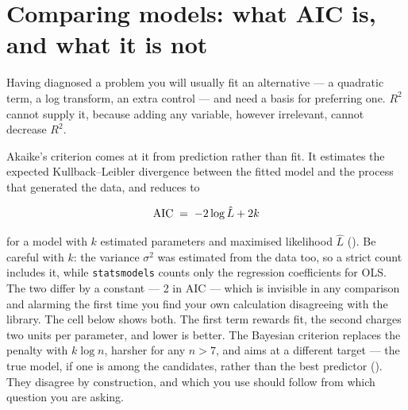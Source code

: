 \documentclass[
  letterpaper,
  10pt,
  twoside,
  openright,
  numbers=noenddot,
  chapterprefix=true]{scrbook}
\begin{document}
\section{Comparing models: what AIC is, and what it is
not}\label{comparing-models-what-aic-is-and-what-it-is-not}

Having diagnosed a problem you will usually fit an alternative --- a
quadratic term, a log transform, an extra control --- and need a basis
for preferring one. \(R^2\) cannot supply it, because adding any
variable, however irrelevant, cannot decrease \(R^2\).

Akaike's criterion comes at it from prediction rather than fit. It
estimates the expected Kullback--Leibler divergence between the fitted
model and the process that generated the data, and reduces to

\[
\mathrm{AIC} \thickspace=\thickspace -2 \log \hat{L} + 2k
\]

for a model with \(k\) estimated parameters and maximised likelihood
\(\hat L\) (). Be careful with
\(k\): the variance \(\sigma^2\) was estimated from the data too, so a
strict count includes it, while \texttt{statsmodels} counts only the
regression coefficients for OLS. The two differ by a constant --- 2 in
AIC --- which is invisible in any comparison and alarming the first time
you find your own calculation disagreeing with the library. The cell
below shows both. The first term rewards fit, the second charges two
units per parameter, and lower is better. The Bayesian criterion
replaces the penalty with \(k \log n\), harsher for any \(n > 7\), and
aims at a different target --- the true model, if one is among the
candidates, rather than the best predictor
(). They disagree by
construction, and which you use should follow from which question you
are asking.
\end{document}
